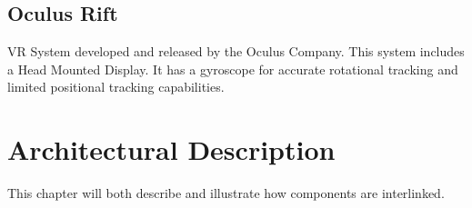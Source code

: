 \documentclass[11pt,a4paper]{report}
\begin{document}
\section*{Oculus Rift}
VR System developed and released by the Oculus Company. This system includes a Head
Mounted Display. It has a gyroscope for accurate rotational tracking and limited positional
tracking capabilities.


\chapter{Architectural Description}
  This chapter will both describe and illustrate how components are interlinked.


\end{document}
